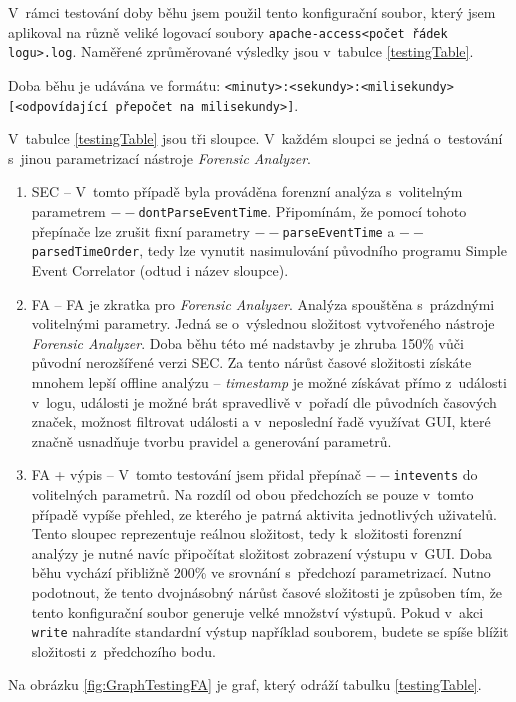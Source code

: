 \documentclass[thesis=B,czech]{FITthesis}[2012/06/26]
\begin{document}
V~rámci testování doby běhu jsem použil tento konfigurační soubor, který jsem aplikoval na různě veliké logovací soubory \texttt{apache-access<počet řádek logu>.log}. Naměřené zprůměrované výsledky jsou v~tabulce \ref{testingTable}.

Doba běhu je udávána ve formátu: \texttt{<minuty>:<sekundy>:<milisekundy>} \\ \texttt{[<odpovídající přepočet na milisekundy>]}. 

V~tabulce \ref{testingTable} jsou tři sloupce. V~každém sloupci se jedná o~testování s~jinou parametrizací nástroje \textit{Forensic Analyzer}.
\begin{enumerate}
	\item{SEC -- V~tomto případě byla prováděna forenzní analýza s~volitelným parametrem \texttt{$--$dontParseEventTime}. Připomínám, že pomocí tohoto přepínače lze zrušit fixní parametry \texttt{$--$parseEventTime} a \texttt{$--$parsedTimeOrder}, tedy lze vynutit nasimulování původního programu Simple Event Correlator (odtud i název sloupce).}
	\item{FA -- FA je zkratka pro \textit{Forensic Analyzer}. Analýza spouštěna s~prázdnými volitelnými parametry. Jedná se o~výslednou složitost vytvořeného nástroje \textit{Forensic Analyzer}. Doba běhu této mé nadstavby je zhruba 150\% vůči původní nerozšířené verzi SEC. Za tento nárůst časové složitosti získáte mnohem lepší offline analýzu -- \textit{timestamp} je možné získávat přímo z~události v~logu, události je možné brát spravedlivě v~pořadí dle původních časových značek, možnost filtrovat události a v~neposlední řadě využívat GUI, které značně usnadňuje tvorbu pravidel a generování parametrů.}
	\item{FA + výpis -- V~tomto testování jsem přidal přepínač \texttt{$--$intevents} do volitelných parametrů. Na rozdíl od obou předchozích se pouze v~tomto případě vypíše přehled, ze kterého je patrná aktivita jednotlivých uživatelů. Tento sloupec reprezentuje reálnou složitost, tedy k~složitosti forenzní analýzy je nutné navíc připočítat složitost zobrazení výstupu v~GUI. Doba běhu vychází přibližně 200\% ve srovnání s~předchozí parametrizací. Nutno podotnout, že tento dvojnásobný nárůst časové složitosti je způsoben tím, že tento konfigurační soubor generuje velké množství výstupů. Pokud v~akci \texttt{write} nahradíte standardní výstup například souborem, budete se spíše blížit složitosti z~předchozího bodu.}
\end{enumerate}

Na obrázku \ref{fig:GraphTestingFA} je graf, který odráží tabulku \ref{testingTable}. 
\end{document}
